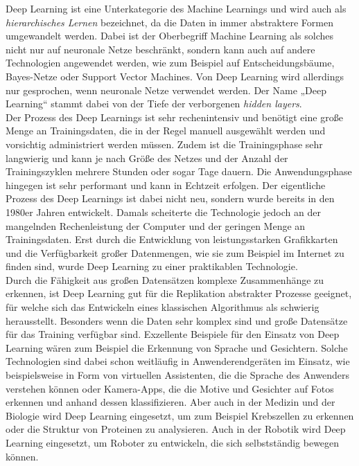 \newpage

\noindent Deep Learning ist eine Unterkategorie des Machine Learnings und wird auch als \textit{hierarchisches Lernen} bezeichnet, da die Daten in immer abstraktere Formen umgewandelt werden. Dabei ist der Oberbegriff Machine Learning als solches nicht nur auf neuronale Netze beschränkt, sondern kann auch auf andere Technologien angewendet werden, wie zum Beispiel auf Entscheidungsbäume, Bayes-Netze oder Support Vector Machines. Von Deep Learning wird allerdings nur gesprochen, wenn neuronale Netze verwendet werden. Der Name „Deep Learning“ stammt dabei von der Tiefe der verborgenen \textit{hidden layers}.\\

\noindent Der Prozess des Deep Learnings ist sehr rechenintensiv und benötigt eine große Menge an Trainingsdaten, die in der Regel manuell ausgewählt werden und vorsichtig administriert werden müssen. Zudem ist die Trainingsphase sehr langwierig und kann je nach Größe des Netzes und der Anzahl der Trainingszyklen mehrere Stunden oder sogar Tage dauern. Die Anwendungsphase hingegen ist sehr performant und kann in Echtzeit erfolgen. Der eigentliche Prozess des Deep Learnings ist dabei nicht neu, sondern wurde bereits in den 1980er Jahren entwickelt. Damals scheiterte die Technologie jedoch an der mangelnden Rechenleistung der Computer und der geringen Menge an Trainingsdaten. Erst durch die Entwicklung von leistungsstarken Grafikkarten und die Verfügbarkeit großer Datenmengen, wie sie zum Beispiel im Internet zu finden sind, wurde Deep Learning zu einer praktikablen Technologie. \\

\noindent Durch die Fähigkeit aus großen Datensätzen komplexe Zusammenhänge zu erkennen, ist Deep Learning gut für die Replikation abstrakter Prozesse geeignet, für welche sich das Entwickeln eines klassischen Algorithmus als schwierig herausstellt. Besonders wenn die Daten sehr komplex sind und große Datensätze für das Training verfügbar sind. Exzellente Beispiele für den Einsatz von Deep Learning wären zum Beispiel die Erkennung von Sprache und Gesichtern. Solche Technologien sind dabei schon weitläufig in Anwenderendgeräten im Einsatz, wie beispielsweise in Form von virtuellen Assistenten, die die Sprache des Anwenders verstehen können oder Kamera-Apps, die die Motive und Gesichter auf Fotos erkennen und anhand dessen klassifizieren. Aber auch in der Medizin und der Biologie wird Deep Learning eingesetzt, um zum Beispiel Krebszellen zu erkennen oder die Struktur von Proteinen zu analysieren. Auch in der Robotik wird Deep Learning eingesetzt, um Roboter zu entwickeln, die sich selbstständig bewegen können. \\

\newpage